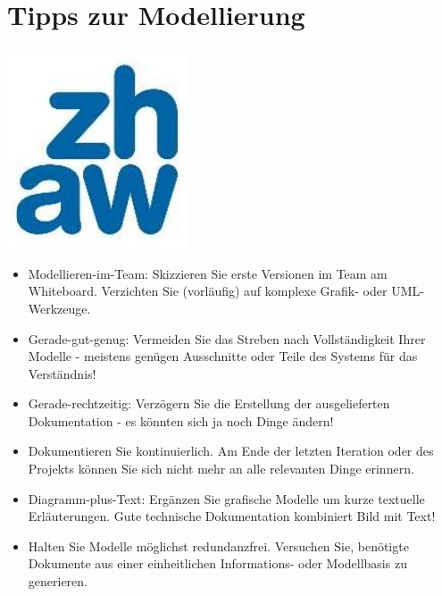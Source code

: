 \documentclass[10pt]{article}
\begin{document}
\section*{Tipps zur Modellierung}
\begin{center}
\includegraphics[width=\linewidth]{images/2025_01_02_787afb9584031d2940deg-20}
\end{center}

\begin{itemize}
  \item Modellieren-im-Team: Skizzieren Sie erste Versionen im Team am Whiteboard. Verzichten Sie (vorläufig) auf komplexe Grafik- oder UML-Werkzeuge.
  \item Gerade-gut-genug: Vermeiden Sie das Streben nach Vollständigkeit Ihrer Modelle - meistens genügen Ausschnitte oder Teile des Systems für das Verständnis!
  \item Gerade-rechtzeitig: Verzögern Sie die Erstellung der ausgelieferten Dokumentation - es könnten sich ja noch Dinge ändern!
  \item Dokumentieren Sie kontinuierlich. Am Ende der letzten Iteration oder des Projekts können Sie sich nicht mehr an alle relevanten Dinge erinnern.
  \item Diagramm-plus-Text: Ergänzen Sie grafische Modelle um kurze textuelle Erläuterungen. Gute technische Dokumentation kombiniert Bild mit Text!
  \item Halten Sie Modelle möglichst redundanzfrei. Versuchen Sie, benötigte Dokumente aus einer einheitlichen Informations- oder Modellbasis zu generieren.
\end{itemize}
\end{document}
